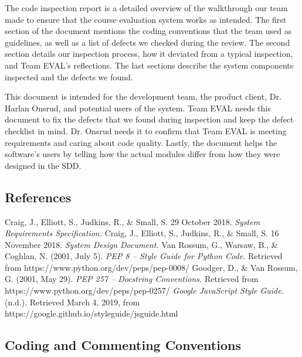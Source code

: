 \documentclass{article}
\begin{document}
The code inspection report is a detailed overview of the walkthrough our team made to ensure that the course evaluation system works as intended. The first section of the document mentions the coding conventions that the team used as guidelines, as well as a list of defects we checked during the review. The second section details our inspection process, how it deviated from a typical inspection, and Team EVAL's reflections. The last sections describe the system components inspected and the defects we found.

This document is intended for the development team, the product client, Dr. Harlan Onsrud, and potential users of the system. Team EVAL needs this document to fix the defects that we found during inspection and keep the defect checklist in mind. Dr. Onsrud needs it to confirm that Team EVAL is meeting requirements and caring about code quality. Lastly, the document helps the software's users by telling how the actual modules differ from how they were designed in the SDD.

\subsection{References}

Craig, J., Elliott, S., Judkins, R., \& Small, S. 29 October 2018. \textit{System Requirements Specification.}
\vspace{3mm}\newline
Craig, J., Elliott, S., Judkins, R., \& Small, S. 16 November 2018. \textit{System Design Document.}
\vspace{3mm}\newline
Van Rossum, G., Warsaw, B., \& Coghlan, N. (2001, July 5). \textit{PEP 8 -- Style Guide for Python Code.} Retrieved from https://www.python.org/dev/peps/pep-0008/
\vspace{3mm}\newline
Goodger, D., \& Van Rossum, G. (2001, May 29). \textit{PEP 257 -- Docstring Conventions.} Retrieved from https://www.python.org/dev/peps/pep-0257/
\vspace{3mm}\newline
\textit{Google JavaScript Style Guide.} (n.d.). Retrieved March 4, 2019, from https://google.github.io/styleguide/\newline jsguide.html

\subsection{Coding and Commenting Conventions}
\end{document}
